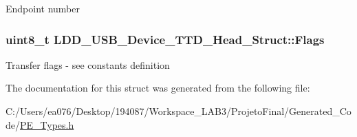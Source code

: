 Endpoint number \hypertarget{struct_l_d_d___u_s_b___device___t_t_d___head___struct_a9572bb866ff1f22ed881f3ff618c0445}{
\subsubsection[{Flags}]{\setlength{\rightskip}{0pt plus 5cm}uint8\-\_\-t L\-D\-D\-\_\-\-U\-S\-B\-\_\-\-Device\-\_\-\-T\-T\-D\-\_\-\-Head\-\_\-\-Struct\-::\-Flags}}\label{struct_l_d_d___u_s_b___device___t_t_d___head___struct_a9572bb866ff1f22ed881f3ff618c0445}
Transfer flags -\/ see constants definition 

The documentation for this struct was generated from the following file\-:\begin{DoxyCompactItemize}
\item 
C\-:/\-Users/ea076/\-Desktop/194087/\-Workspace\-\_\-\-L\-A\-B3/\-Projeto\-Final/\-Generated\-\_\-\-Code/\hyperlink{_p_e___types_8h}{P\-E\-\_\-\-Types.\-h}\end{DoxyCompactItemize}
